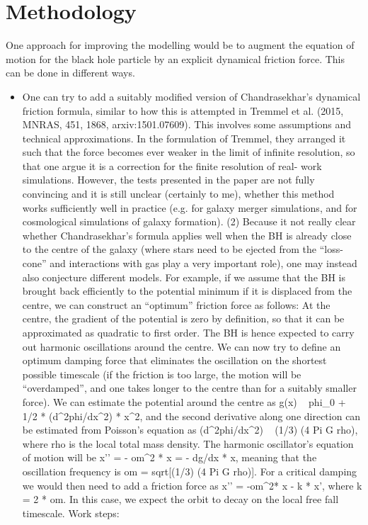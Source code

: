 \documentclass[a4,useAMS,usenatbib,usegraphicx,12pt]{article}
\begin{document}
\section{Methodology}


One approach for improving the modelling would be to augment the equation of 
motion for the black hole particle by an explicit dynamical friction force. 
This can be done in different ways.

\begin{itemize} 
\item One can try to add a suitably modified version of Chandrasekhar’s dynamical friction
formula, similar to how this is attempted in Tremmel et al. (2015, MNRAS, 451, 1868,
arxiv:1501.07609). This involves some assumptions and technical approximations. In the
formulation of Tremmel, they arranged it such that the force becomes ever weaker in the
limit of infinite resolution, so that one argue it is a correction for the finite resolution of real-
work simulations. However, the tests presented in the paper are not fully convincing and it
is still unclear (certainly to me), whether this method works sufficiently well in practice
(e.g. for galaxy merger simulations, and for cosmological simulations of galaxy formation).
(2) Because it not really clear whether Chandrasekhar’s formula applies well when the BH
is already close to the centre of the galaxy (where stars need to be ejected from the “loss-
cone” and interactions with gas play a very important role), one may instead also
conjecture different models. For example, if we assume that the BH is brought back
efficiently to the potential minimum if it is displaced from the centre, we can construct an
“optimum” friction force as follows: At the centre, the gradient of the potential is zero by
definition, so that it can be approximated as quadratic to first order. The BH is hence
expected to carry out harmonic oscillations around the centre. We can now try to define
an optimum damping force that eliminates the oscillation on the shortest possible
timescale (if the friction is too large, the motion will be “overdamped”, and one takes
longer to the centre than for a suitably smaller force). We can estimate the potential
around the centre as g(x) ~ phi_0 + 1/2 * (d^2phi/dx^2) * x^2, and the second derivative
along one direction can be estimated from Poisson’s equation as (d^2phi/dx^2) ~ (1/3) (4
Pi G rho), where rho is the local total mass density. The harmonic oscillator’s equation of
motion will be x’’ = - om^2 * x = - dg/dx * x, meaning that the oscillation frequency is om
= sqrt[(1/3) (4 Pi G rho)]. For a critical damping we would then need to add a friction force
as x’’ = -om^2* x - k * x’, where k = 2 * om. In this case, we expect the orbit to decay on
the local free fall timescale.
Work steps:


\end{itemize}
\end{document}
